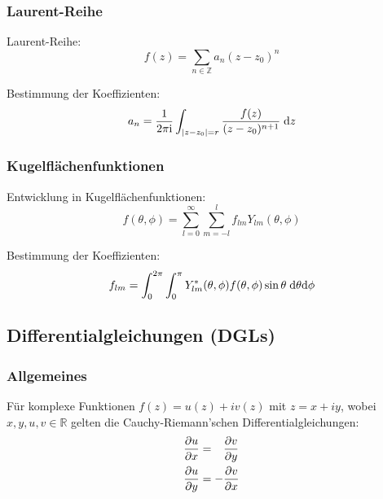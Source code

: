 \documentclass[11pt]{article}
\numberwithin{equation}{section}
\begin{document}
			\subsubsection{Laurent-Reihe}
				\noindent
				Laurent-Reihe:
				\begin{equation}
					f(z)=\sum_{n\in\mathbb{Z}} a_n(z-z_0)^n
				\end{equation}

				\noindent
				Bestimmung der Koeffizienten:
				\begin{equation}
					a_n = \frac{1}{2 \pi \mathrm{i}}\int_{\left| z-z_0 \right| = r} \frac{f(z)}{(z-z_0)^{n+1}}\;\mathrm{d} z
				\end{equation}

			\subsubsection{Kugelflächenfunktionen}
				\noindent
				Entwicklung in Kugelflächenfunktionen:
				\begin{equation}
					f(\theta, \phi) = \sum_{l=0}^{\infty} \sum_{m=-l}^{l} f_{lm} Y_{lm}(\theta,\phi)
				\end{equation}

				\noindent
				Bestimmung der Koeffizienten:
				\begin{equation}
					f_{lm} = \int_0^{2\pi} \int_0^\pi Y_{lm}^{*}(\theta,\phi) f(\theta,\phi) \sin\theta\;\mathrm{d}\theta\mathrm{d}\phi
				\end{equation}

		\subsection{Differentialgleichungen (DGLs)}
			\subsubsection{Allgemeines}
				\noindent
				Für komplexe Funktionen $f(z)=u(z)+iv(z)$ mit $z=x+iy$, wobei $x,y,u,v\in\mathbb{R}$ gelten die Cauchy-Riemann'schen Differentialgleichungen:
				\begin{equation}
					\begin{aligned}
						\frac{\partial u}{\partial x} &= \phantom{-}\frac{\partial v}{\partial y} \\
						\frac{\partial u}{\partial y} &= -\frac{\partial v}{\partial x} \\
					\end{aligned}
				\end{equation}
\end{document}
